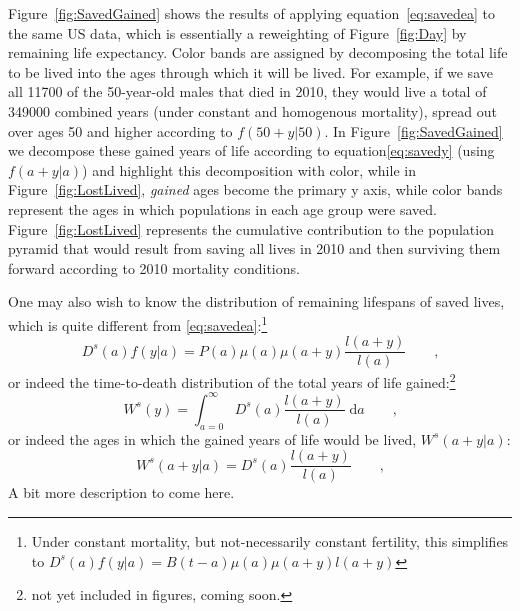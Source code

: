 \documentclass{article}
\newcommand{\dd}{\; \mathrm{d}}
\newcommand{\tc}{\quad\quad\text{,}}
\begin{document}
Figure~\ref{fig:SavedGained} shows the results of applying
equation~\eqref{eq:savedea} to the same US data, which is essentially a
reweighting of Figure~\ref{fig:Day} by remaining life expectancy. Color bands
are assigned by decomposing the total life to be lived into the ages through
which it will be lived. For example, if we save all 11700 of the 50-year-old
males that died in 2010, they would live a total of 349000 combined years (under
constant and homogenous mortality), spread out over ages 50 and higher according
to $f(50+y|50)$. In Figure~\ref{fig:SavedGained} we decompose these gained
years of life according to equation\eqref{eq:savedy} (using $f(a+y|a)$) and
highlight this decomposition with color, while in Figure~\ref{fig:LostLived}, \textit{gained} ages become the primary y axis,
while color bands represent the ages in which populations in each age group were
saved. Figure~\ref{fig:LostLived} represents the cumulative contribution to the
population pyramid that would result from saving all lives in 2010 and then
surviving them forward according to 2010 mortality conditions.

One may also wish to know the distribution of remaining lifespans of saved
lives, which is quite different from \eqref{eq:savedea}:\footnote{Under constant mortality, but
not-necessarily constant fertility, this simplifies to $D^s(a)f(y|a) =
B(t-a)\mu(a)\mu(a+y)l(a+y)$}
\begin{equation}
\label{eq:savedy}
D^s(a)f(y|a) = P(a)\mu(a)\mu(a+y) \frac{l(a+y)}{l(a)} \tc
\end{equation}
or indeed the time-to-death distribution of the total years of life
gained:\footnote{not yet included in figures, coming soon.}
\begin{equation}
\label{eq:gainedy}
W^s(y) = \int_{a=0}^\infty D^s(a)\frac{l(a+y)}{l(a)} \dd a \tc
\end{equation}
or indeed the ages in which the gained years of life would be lived,
$W^s(a+y|a)$:
\begin{equation}
\label{eq:gaineday}
W^s(a+y|a) = D^s(a)\frac{l(a+y)}{l(a)} \tc
\end{equation}
A bit more description to come here.
\end{document}
